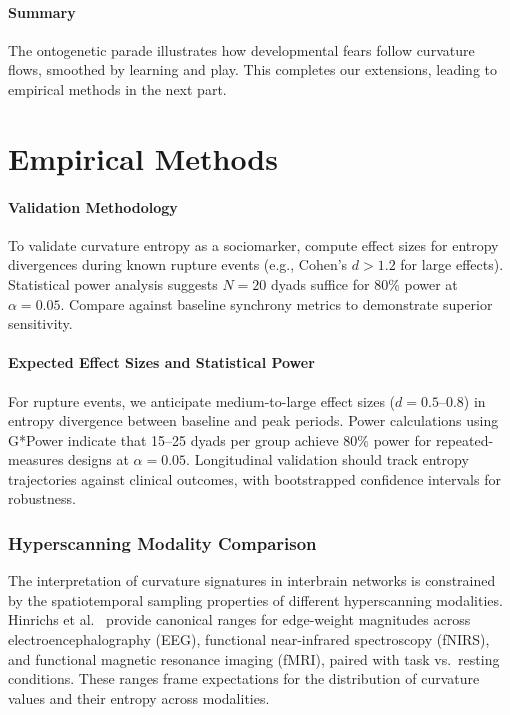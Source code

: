 \documentclass{article}
\theoremstyle{definition}
\begin{document}
\subsection{Summary}

The ontogenetic parade illustrates how developmental fears follow curvature flows, smoothed by learning and play. This completes our extensions, leading to empirical methods in the next part.

\part{Empirical Methods}

\subsection{Validation Methodology}

To validate curvature entropy as a sociomarker, compute effect sizes for entropy
divergences during known rupture events (e.g., Cohen's $d > 1.2$ for large
effects). Statistical power analysis suggests $N=20$ dyads suffice for 80\% power
at $\alpha=0.05$. Compare against baseline synchrony metrics to demonstrate
superior sensitivity.

\subsection{Expected Effect Sizes and Statistical Power}

For rupture events, we anticipate medium-to-large effect sizes ($d=0.5$--$0.8$) in entropy divergence between baseline and peak periods. Power calculations using G*Power indicate that 15--25 dyads per group achieve 80\% power for repeated-measures designs at $\alpha=0.05$. Longitudinal validation should track entropy trajectories against clinical outcomes, with bootstrapped confidence intervals for robustness.

\section{Hyperscanning Modality Comparison}

The interpretation of curvature signatures in interbrain networks is constrained
by the spatiotemporal sampling properties of different hyperscanning modalities.
Hinrichs et al.~\cite{hinrichs2025geometry} provide canonical ranges for
edge-weight magnitudes across electroencephalography (EEG), functional near-infrared
spectroscopy (fNIRS), and functional magnetic resonance imaging (fMRI), paired
with task vs.\ resting conditions. These ranges frame expectations for the
distribution of curvature values and their entropy across modalities.
\end{document}
